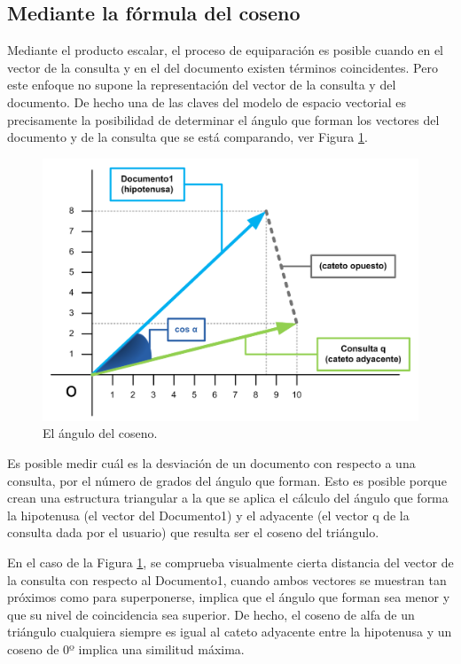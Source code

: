 \documentclass{article}
\begin{document}
\subsection{Mediante la fórmula del coseno}

Mediante el producto escalar, el proceso de equiparación es posible cuando en el vector de la consulta y en el del documento existen términos coincidentes. Pero este enfoque no supone la representación del vector de la consulta y del documento. De hecho una de las claves del modelo de espacio vectorial es precisamente la posibilidad de determinar el ángulo que forman los vectores del documento y de la consulta que se está comparando, ver Figura \ref{fig: Figure 2}.

\begin{figure}[h]
	\begin{center}
		\includegraphics*[scale=0.9]{similitud_coseno.png}
	\end{center}
	\caption{El ángulo del coseno.}
	\label{fig: Figure 2}
\end{figure}

Es posible medir cuál es la desviación de un documento con respecto a una consulta, por el número de grados del ángulo que forman. Esto es posible porque crean una estructura triangular a la que se aplica el cálculo del ángulo que forma la hipotenusa (el vector del Documento1) y el adyacente (el vector q de la consulta dada por el usuario) que resulta ser el coseno del triángulo. 

En el caso de la Figura \ref{fig: Figure 2}, se comprueba visualmente cierta distancia del vector de la consulta con respecto al Documento1, cuando ambos vectores se muestran tan próximos como para superponerse, implica que el ángulo que forman sea menor y que su nivel de coincidencia sea superior. De hecho, el coseno de alfa de un triángulo cualquiera siempre es igual al cateto adyacente entre la hipotenusa y un coseno de 0º implica una similitud máxima.
\end{document}
